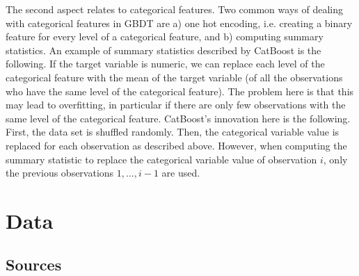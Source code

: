 \documentclass{article}
\newcommand{\comment}[1]{}
\begin{document}
	The second aspect relates to categorical features. Two common ways of dealing with categorical features in GBDT are a) one hot encoding, i.e. creating a binary feature for every level of a categorical feature, and b) computing summary statistics. An example of summary statistics described by CatBoost is the following. If the target variable is numeric, we can  replace each level of the categorical feature with the mean of the target variable (of all the observations who have the same level of the categorical feature). The problem here is that this may lead to overfitting, in particular if there are only few observations with the same level of the categorical feature. CatBoost's innovation here is the following. First, the data set is shuffled randomly. Then, the categorical variable value is replaced for each observation as described above. However, when computing the summary statistic to replace the categorical variable value of observation $i$, only the previous observations $1, ..., i-1$ are used.

	
	\comment{
		
	\begin{align}
		\mathrm{L^{(t)}} = \sum_{i=1}^n l(y_i, \hat{y_i}^{(t-1)} + f_t(\textbf{x}_i)), 
	\end{align}

		
	To fit each tree, the gradient of a differentiable loss function is used. Non-numerical features are generally converted to numerical features and therefore the gradient can also be used for categorical variables.
		
		
	- Questions:
		- Errors made by the ensemble (?) classifier
		- All variables are converted to numerical features and therefore
		- Is the structure tree learned once? Or is a new tree structure fitted in every iteration? (Are the gradients also used for the tree structure or only for the tresholds?)
		- How is the gradient used for numerical variables?
		- Are non-numerical features are generally converted to numerical features???
		
	}


	\section{Data}
	
	\subsection{Sources}
	
\end{document}
